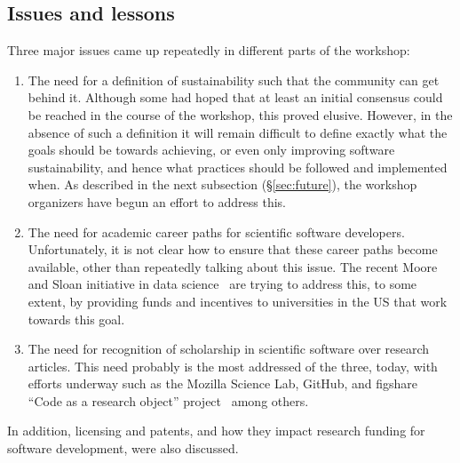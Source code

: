\documentclass[11pt, oneside]{amsart}
\newcommand{\note}[1]{ {\textcolor{red}    { #1 }}}
\begin{document}
\subsection{Issues and lessons}


Three major issues came up repeatedly in different parts of the workshop:

\begin{enumerate}
\item The need for a definition of sustainability such that the
  community can get behind it. Although some had hoped that at least
  an initial consensus could be reached in the course of the workshop,
  this proved elusive. However, in the absence of such a definition it
  will remain difficult to define exactly what the goals should be
  towards achieving, or even only improving software sustainability,
  and hence what practices should be followed and implemented when. As
  described in the next subsection (\S\ref{sec:future}), the workshop
  organizers have begun an effort to address this.

\item The need for academic career paths for scientific software
  developers.  Unfortunately, it is not clear how to ensure that these
  career paths become available, other than repeatedly talking about
  this issue. The recent Moore and Sloan initiative in data
  science~\cite{moore_sloan} are trying to address this, to some
  extent, by providing funds and incentives to universities in the US
  that work towards this goal.

%
%
%

\item The need for recognition of scholarship in scientific software
  over research articles. This need probably is the most addressed of
  the three, today, with efforts underway such as the Mozilla Science
  Lab, GitHub, and figshare ``Code as a research object''
  project~\cite{code_as_a_research_object} among others.

\end{enumerate}
%
In addition, licensing and patents, and how they impact research funding
for software development, were also discussed.
\end{document}

